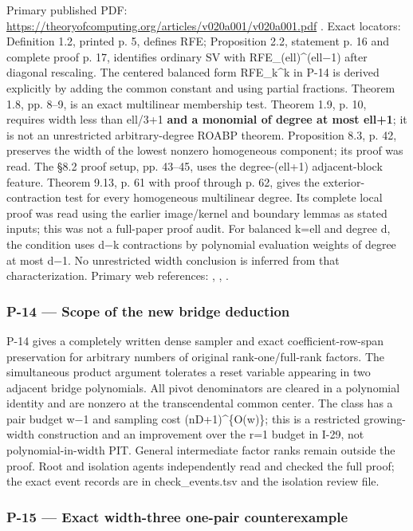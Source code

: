 \documentclass[11pt,a4paper]{article}
\theoremstyle{definition}\newtheorem{definition}{Definition}
\begin{document}
Primary published PDF:
\url{https://theoryofcomputing.org/articles/v020a001/v020a001.pdf} .
Exact locators: Definition 1.2, printed p. 5, defines RFE; Proposition
2.2, statement p. 16 and complete proof p. 17, identifies ordinary SV
with RFE\_(ell)\^{}(ell−1) after diagonal rescaling. The centered
balanced form RFE\_k\^{}k in P-14 is derived explicitly by adding the
common constant and using partial fractions. Theorem 1.8, pp. 8--9, is
an exact multilinear membership test. Theorem 1.9, p. 10, requires width
less than ell/3+1 \textbf{and a monomial of degree at most ell+1}; it is
not an unrestricted arbitrary-degree ROABP theorem. Proposition 8.3, p.
42, preserves the width of the lowest nonzero homogeneous component; its
proof was read. The §8.2 proof setup, pp. 43--45, uses the
degree-(ell+1) adjacent-block feature. Theorem 9.13, p. 61 with proof
through p. 62, gives the exterior-contraction test for every homogeneous
multilinear degree. Its complete local proof was read using the earlier
image/kernel and boundary lemmas as stated inputs; this was not a
full-paper proof audit. For balanced k=ell and degree d, the condition
uses d−k contractions by polynomial evaluation weights of degree at most
d−1. No unrestricted width conclusion is inferred from that
characterization. Primary web references: , , .

\subsubsection{P-14 --- Scope of the new bridge
deduction}\label{p-14--scope-of-the-new-bridge-deduction}

P-14 gives a completely written dense sampler and exact
coefficient-row-span preservation for arbitrary numbers of original
rank-one/full-rank factors. The simultaneous product argument tolerates
a reset variable appearing in two adjacent bridge polynomials. All pivot
denominators are cleared in a polynomial identity and are nonzero at the
transcendental common center. The class has a pair budget w−1 and
sampling cost (nD+1)\^{}\{O(w)\}; this is a restricted growing-width
construction and an improvement over the r=1 budget in I-29, not
polynomial-in-width PIT. General intermediate factor ranks remain
outside the proof. Root and isolation agents independently read and
checked the full proof; the exact event records are in check\_events.tsv
and the isolation review file.

\subsubsection{P-15 --- Exact width-three one-pair
counterexample}\label{p-15--exact-width-three-one-pair-counterexample}
\end{document}

